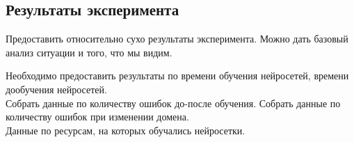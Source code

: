 \subsection{Результаты эксперимента}

Предоставить относительно сухо результаты эксперимента. Можно дать базовый анализ ситуации и того, что мы видим.

Необходимо предоставить результаты по времени обучения нейросетей, времени дообучения нейросетей. \\ 
Собрать данные по количеству ошибок до-после обучения. Собрать данные по количеству ошибок при изменении домена. \\ 
Данные по ресурсам, на которых обучались нейросетки.


\newpage